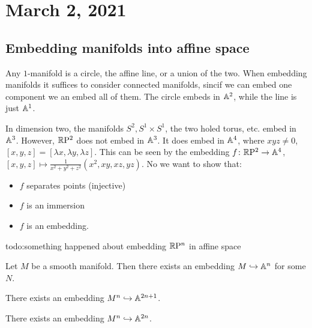 \section{March 2, 2021}
\subsection{Embedding manifolds into affine space}
\begin{example}
    Any $1$-manifold is a circle, the affine line, or a union of the two. When embedding manifolds it suffices to consider connected manifolds, sincif we can embed one component we an embed all of them. The circle embeds in $\mathbb{A}^2$, while the line is just $\mathbb{A}^1$.

    In dimension two, the manifolds $S^2, S^1  \times S^1 $, the two holed torus, etc. embed in $\mathbb{A}^3$. However, $\mathbb{R} \mathrm P^2$ does not embed in $\mathbb{A}^3$. It does embed in $\mathbb{A}^4$, where $xyz\neq 0$, $[x,y,z]=[\lambda x,\lambda y,\lambda z]$. This can be seen by the embedding $f \colon \mathbb{R} \mathrm P^2 \to \mathbb{A}^4$, $[x,y,z] \mapsto \frac{1}{x^2+y^2+z^2}(x^2,xy,xz,yz)$. No we want to show that: 
    \begin{itemize}
        \item $f$ separates points (injective)
        \item $f$ is an immersion
        \item $f$ is an embedding.
    \end{itemize} {\color{red}todo:something happened about embedding $\mathbb{R} \mathrm P^n$ in affine space} 
\end{example}
\begin{theorem}\label{1}
    Let $M$ be a smooth manifold. Then there exists an embedding $M \hookrightarrow \mathbb{A}^n $ for some $N$.
\end{theorem}
\begin{theorem}
   There exists an embedding $M^n  \hookrightarrow \mathbb{A}^{2n+1}$. 
\end{theorem}
\begin{theorem}
   There exists an embedding $M^n  \hookrightarrow \mathbb{A}^{2n}$.
\end{theorem}
